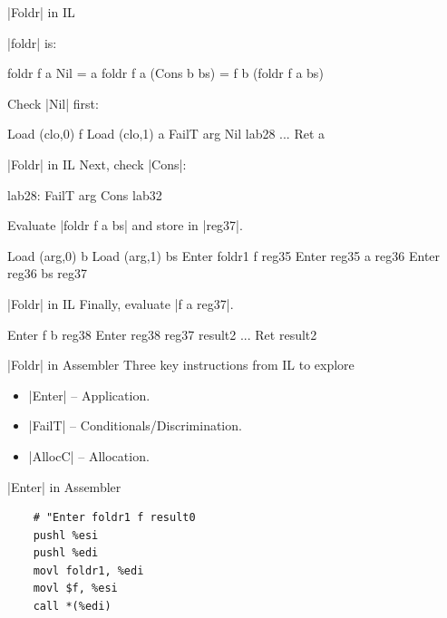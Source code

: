\documentclass{beamer}
\begin{document}
\begin{frame}{|Foldr| in IL}
  
  |foldr| is:

  \begin{code}
    foldr f a Nil = a
    foldr f a (Cons b bs) = f b (foldr f a bs)
  \end{code}

Check |Nil| first:
  \begin{code}
  Load (clo,0) f
  Load (clo,1) a
  FailT arg Nil lab28
  ...
  Ret a
  \end{code}


\end{frame}

\begin{frame}{|Foldr| in IL}
  Next, check |Cons|:
  \begin{code}
lab28: FailT arg Cons lab32
  \end{code}

Evaluate |foldr f a bs| and store in |reg37|.
  \begin{code}
  Load (arg,0) b
  Load (arg,1) bs
  Enter foldr1 f reg35
  Enter reg35 a reg36
  Enter reg36 bs reg37
  \end{code}
\end{frame}

\begin{frame}{|Foldr| in IL}
Finally, evaluate |f a reg37|.
  \begin{code}
  Enter f b reg38
  Enter reg38 reg37 result2
  ...
  Ret result2
  \end{code}
\end{frame}

\begin{frame}{|Foldr| in Assembler}
  Three key instructions from IL to explore
  \begin{itemize}
  \item |Enter| -- Application.
  \item |FailT| -- Conditionals/Discrimination.
  \item |AllocC| -- Allocation.
  \end{itemize}
\end{frame}

\begin{frame}{|Enter| in Assembler}
  
\begin{verbatim}
    # "Enter foldr1 f result0
    pushl %esi
    pushl %edi
    movl foldr1, %edi
    movl $f, %esi
    call *(%edi)
\end{verbatim}

\end{frame}
\end{document}
